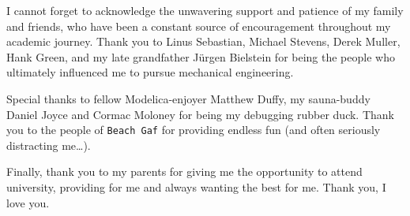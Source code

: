 I cannot forget to acknowledge the unwavering support and patience of my family and friends, who have been a constant source of encouragement throughout my academic journey. Thank you to Linus Sebastian, Michael Stevens, Derek Muller, Hank Green, and my late grandfather J\"urgen Bielstein for being the people who ultimately influenced me to pursue mechanical engineering. 


Special thanks to fellow Modelica-enjoyer Matthew Duffy, my sauna-buddy Daniel Joyce and Cormac Moloney for being my debugging rubber duck. Thank you to the people of \texttt{Beach Gaf} for providing endless fun (and often seriously distracting me\ldots).

Finally, thank you to my parents for giving me the opportunity to attend university, providing for me and always wanting the best for me. Thank you, I love you.








\endgroup
